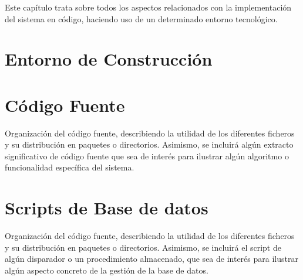 

Este capítulo trata sobre todos los aspectos relacionados con la implementación del sistema en código, haciendo uso de un determinado entorno tecnológico.

\section{Entorno de Construcción}
\label{sec:ConstructionEnvironment}


\section{Código Fuente}
Organización del código fuente, describiendo la utilidad de los diferentes ficheros y su distribución en paquetes o directorios. Asimismo, se incluirá algún extracto significativo de código fuente que sea de interés para ilustrar algún algoritmo o funcionalidad específica del sistema.

\section{Scripts de Base de datos}
Organización del código fuente, describiendo la utilidad de los diferentes ficheros y su distribución en paquetes o directorios. Asimismo, se incluirá el script de algún disparador o un procedimiento almacenado, que sea de interés para ilustrar algún aspecto concreto de la gestión de la base de datos.
